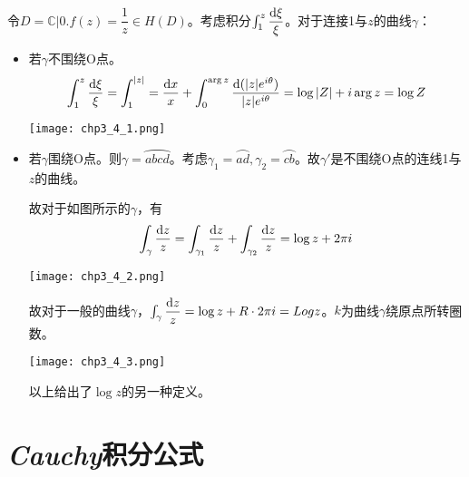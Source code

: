 令$D=\mathbb{C}|{0}.f(z)=\dfrac{1}{z}\in H(D)$。考虑积分$\int_{1}^{z}\dfrac{\mathrm{d}\xi}{\xi}$。对于连接1与$z$的曲线$\gamma$：
\begin{itemize}
	\item 若$\gamma$不围绕O点。
	\[\int_{1}^{z}\dfrac{\mathrm{d}\xi}{\xi}=\int_{1}^{|z|}=\dfrac{\mathrm{d}x}{x}+\int_{0}^{\arg z}\dfrac{\mathrm{d}(|z|e^{i\theta})}{|z|e^{i\theta}}=\log|Z|+i\arg z=\log Z\]
	\begin{center}
		\texttt{[image: chp3\_4\_1.png]}
	\end{center}
	\item 若$\gamma$围绕O点。则$\gamma=\wideparen{abcd}$。考虑$\gamma_1=\wideparen{ad},\gamma_2=\wideparen{cb}$。故$\gamma'$是不围绕O点的连线1与$z$的曲线。
	
	故对于如图所示的$\gamma$，有
	\[\int_\gamma\dfrac{\mathrm{d}z}{z}=\int_{\gamma_1}\dfrac{\mathrm{d}z}{z}+\int_{\gamma_2}\dfrac{\mathrm{d}z}{z}=\log z+2\pi i\]
	\begin{center}
		\texttt{[image: chp3\_4\_2.png]}
	\end{center}
	故对于一般的曲线$\gamma$，$\int_\gamma\dfrac{\mathrm{d}z}{z}=\log z+R\cdot2\pi i=Logz$。$k$为曲线$\gamma$绕原点所转圈数。
	\begin{center}
		\texttt{[image: chp3\_4\_3.png]}
	\end{center}
	以上给出了$\log z$的另一种定义。
\end{itemize}


\section{\emph{Cauchy}积分公式}

